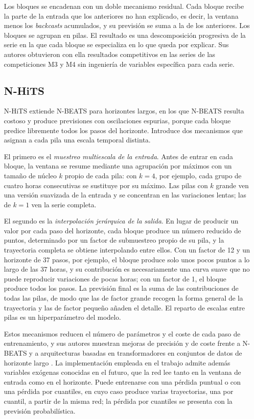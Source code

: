 Los bloques se encadenan con un doble mecanismo residual. Cada bloque recibe
la parte de la entrada que los anteriores no han explicado, es decir, la
ventana menos los \textit{backcasts} acumulados, y su previsión se suma a la
de los anteriores. Los bloques se agrupan en pilas. El resultado es una
descomposición progresiva de la serie en la que cada bloque se especializa en
lo que queda por explicar. Sus autores obtuvieron con ella resultados
competitivos en las series de las competiciones M3 y M4 sin ingeniería de
variables específica para cada serie.

\subsection{N-HiTS}\label{sec:nhits}

N-HiTS \parencite{challu2023nhits} extiende N-BEATS para horizontes largos,
en los que N-BEATS resulta costoso y produce previsiones con oscilaciones
espurias, porque cada bloque predice libremente todos los pasos del
horizonte. Introduce dos mecanismos que asignan a cada pila una escala
temporal distinta.

El primero es el \emph{muestreo multiescala de la entrada}. Antes de entrar
en cada bloque, la ventana se resume mediante una agrupación por máximos con
un tamaño de núcleo $k$ propio de cada pila: con $k = 4$, por ejemplo, cada
grupo de cuatro horas consecutivas se sustituye por su máximo. Las pilas con
$k$ grande ven una versión suavizada de la entrada y se concentran en las
variaciones lentas; las de $k = 1$ ven la serie completa.

El segundo es la \emph{interpolación jerárquica de la salida}. En lugar de
producir un valor por cada paso del horizonte, cada bloque produce un número
reducido de puntos, determinado por un factor de submuestreo propio de su
pila, y la trayectoria completa se obtiene interpolando entre ellos. Con un
factor de 12 y un horizonte de 37 pasos, por ejemplo, el bloque produce solo
unos pocos puntos a lo largo de las 37 horas, y su contribución es
necesariamente una curva suave que no puede reproducir variaciones de pocas
horas; con un factor de 1, el bloque produce todos los pasos. La previsión
final es la suma de las contribuciones de todas las pilas, de modo que las
de factor grande recogen la forma general de la trayectoria y las de factor
pequeño añaden el detalle. El reparto de escalas entre pilas es un
hiperparámetro del modelo.

Estos mecanismos reducen el número de parámetros y el coste de cada paso de
entrenamiento, y sus autores muestran mejoras de precisión y de coste frente
a N-BEATS y a arquitecturas basadas en transformadores en conjuntos de
datos de horizonte largo \parencite{challu2023nhits}. La implementación
empleada en el trabajo admite además variables exógenas conocidas en el
futuro, que la red lee tanto en la ventana de entrada como en el horizonte. Puede entrenarse con una pérdida
puntual o con una pérdida por cuantiles, en cuyo caso produce varias
trayectorias, una por cuantil, a partir de la misma red; la pérdida por
cuantiles se presenta con la previsión probabilística.

